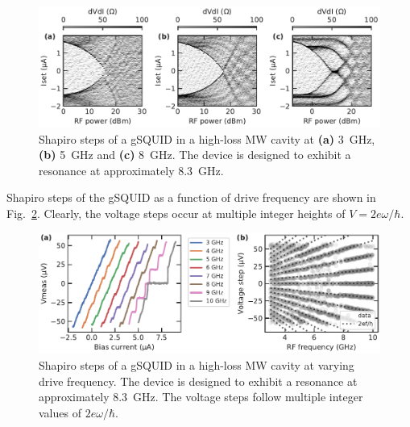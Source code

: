 \begin{figure}
	\centering
	\includegraphics[width=\linewidth]{appendix/gJJ-misc-figs/fig_ShapiroHero}
	\caption{
		Shapiro steps of a gSQUID in a high-loss MW cavity at \textbf{(a)} \SI{3}{\giga\hertz}, \textbf{(b)} \SI{5}{\giga\hertz} and \textbf{(c)} \SI{8}{\giga\hertz}.
		The device is designed to exhibit a resonance at approximately \SI{8.3}{\giga\hertz}.
	}
	\label{fig:ShapiroHero}
\end{figure}

Shapiro steps of the gSQUID as a function of drive frequency are shown in Fig.~\ref{fig:Shapirofreq}.
%
Clearly, the voltage steps occur at multiple integer heights of $V=2e\omega/\hbar$.

\begin{figure}
	\centering
	\includegraphics[width=\linewidth]{appendix/gJJ-misc-figs/fig_ShapiroHeroFreq}
	\caption{
		Shapiro steps of a gSQUID in a high-loss MW cavity at varying drive frequency.
		The device is designed to exhibit a resonance at approximately \SI{8.3}{\giga\hertz}.
		The voltage steps follow multiple integer values of $2e\omega/\hbar$.
	}
	\label{fig:Shapirofreq}
\end{figure}


